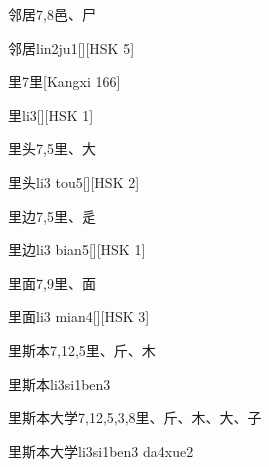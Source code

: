 \begin{Entry}{邻居}{7,8}{⾢、⼫}
  \begin{Phonetics}{邻居}{lin2ju1}[][HSK 5]
  \end{Phonetics}
\end{Entry}

\begin{Entry}{里}{7}{⾥}[Kangxi 166]
  \begin{Phonetics}{里}{li3}[][HSK 1]
  \end{Phonetics}
\end{Entry}

\begin{Entry}{里头}{7,5}{⾥、⼤}
  \begin{Phonetics}{里头}{li3 tou5}[][HSK 2]
  \end{Phonetics}
\end{Entry}

\begin{Entry}{里边}{7,5}{⾥、⾡}
  \begin{Phonetics}{里边}{li3 bian5}[][HSK 1]
  \end{Phonetics}
\end{Entry}

\begin{Entry}{里面}{7,9}{⾥、⾯}
  \begin{Phonetics}{里面}{li3 mian4}[][HSK 3]
  \end{Phonetics}
\end{Entry}

\begin{Entry}{里斯本}{7,12,5}{⾥、⽄、⽊}
  \begin{Phonetics}{里斯本}{li3si1ben3}
  \end{Phonetics}
\end{Entry}

\begin{Entry}{里斯本大学}{7,12,5,3,8}{⾥、⽄、⽊、⼤、⼦}
  \begin{Phonetics}{里斯本大学}{li3si1ben3 da4xue2}
  \end{Phonetics}
\end{Entry}

